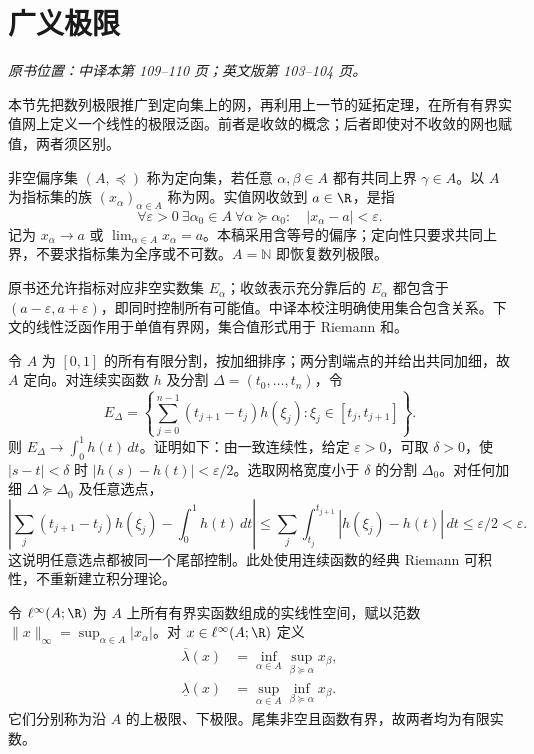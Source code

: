 \section{广义极限}\label{sec:yosida-04-02}
\noindent\textit{原书位置：中译本第 109--110 页；英文版第 103--104 页。}

本节先把数列极限推广到定向集上的网，再利用上一节的延拓定理，在所有有界实值网上定义一个线性的极限泛函。前者是收敛的概念；后者即使对不收敛的网也赋值，两者须区别。

\begin{definition}\label{def:y4-net}
非空偏序集 $(A,\preceq)$ 称为定向集，若任意 $\alpha,\beta\in A$ 都有共同上界 $\gamma\in A$。以 $A$ 为指标集的族 $(x_\alpha)_{\alpha\in A}$ 称为网。实值网收敛到 $a\in\R$，是指
\[
 \forall\varepsilon>0\ \exists\alpha_0\in A\
 \forall\alpha\succeq\alpha_0:\quad |x_\alpha-a|<\varepsilon.
\]
记为 $x_\alpha\to a$ 或 $\lim_{\alpha\in A}x_\alpha=a$。本稿采用含等号的偏序；定向性只要求共同上界，不要求指标集为全序或不可数。$A=\mathbb N$ 即恢复数列极限。
\end{definition}

原书还允许指标对应非空实数集 $E_\alpha$；收敛表示充分靠后的 $E_\alpha$ 都包含于 $(a-\varepsilon,a+\varepsilon)$，即同时控制所有可能值。中译本校注明确使用集合包含关系。下文的线性泛函作用于单值有界网，集合值形式用于 Riemann 和。

\begin{example}\label{ex:y4-riemann-net}
令 $A$ 为 $[0,1]$ 的所有有限分割，按加细排序；两分割端点的并给出共同加细，故 $A$ 定向。对连续实函数 $h$ 及分割 $\Delta=(t_0,\ldots,t_n)$，令
\[
 E_\Delta=\left\{\sum_{j=0}^{n-1}(t_{j+1}-t_j)h(\xi_j):
 \xi_j\in[t_j,t_{j+1}]\right\}.
\]
则 $E_\Delta\to\int_0^1h(t)\,dt$。证明如下：由一致连续性，给定 $\varepsilon>0$，可取 $\delta>0$，使 $|s-t|<\delta$ 时 $|h(s)-h(t)|<\varepsilon/2$。选取网格宽度小于 $\delta$ 的分割 $\Delta_0$。对任何加细 $\Delta\succeq\Delta_0$ 及任意选点，
\[
 \left|\sum_j(t_{j+1}-t_j)h(\xi_j)-\int_0^1h(t)\,dt\right|
 \le\sum_j\int_{t_j}^{t_{j+1}}|h(\xi_j)-h(t)|\,dt
 \le\varepsilon/2<\varepsilon.
\]
这说明任意选点都被同一个尾部控制。此处使用连续函数的经典 Riemann 可积性，不重新建立积分理论。
\end{example}

\begin{definition}[有界网的上下极限]\label{def:y4-tail-limits}
令 $\ell^\infty(A;\R)$ 为 $A$ 上所有有界实函数组成的实线性空间，赋以范数 $\|x\|_\infty=\sup_{\alpha\in A}|x_\alpha|$。对 $x\in\ell^\infty(A;\R)$ 定义
\[
 \begin{aligned}
 \overline\lambda(x)&=\inf_{\alpha\in A}\sup_{\beta\succeq\alpha}x_\beta,\\
 \underline\lambda(x)&=\sup_{\alpha\in A}\inf_{\beta\succeq\alpha}x_\beta.
 \end{aligned}
\]
它们分别称为沿 $A$ 的上极限、下极限。尾集非空且函数有界，故两者均为有限实数。
\end{definition}

